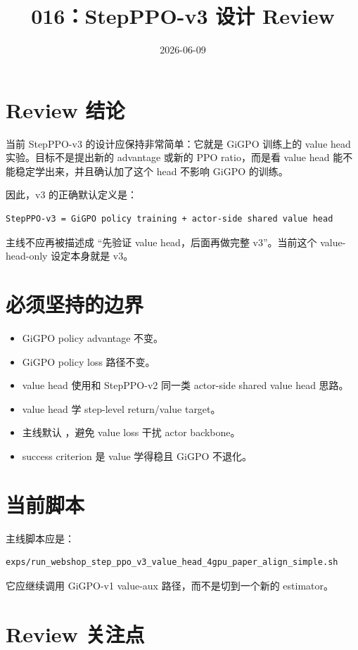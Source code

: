 \documentclass[10pt]{ctexart}
\title{016：StepPPO-v3 设计 Review}
\author{}
\date{2026-06-09}
\begin{document}
\maketitle
\vspace{-1.2em}

\section*{Review 结论}
当前 StepPPO-v3 的设计应保持非常简单：它就是 GiGPO 训练上的 value head 实验。目标不是提出新的 advantage 或新的 PPO ratio，而是看 value head 能不能稳定学出来，并且确认加了这个 head 不影响 GiGPO 的训练。

因此，v3 的正确默认定义是：
\begin{lstlisting}
StepPPO-v3 = GiGPO policy training + actor-side shared value head
\end{lstlisting}

主线不应再被描述成 ``先验证 value head，后面再做完整 v3''。当前这个 value-head-only 设定本身就是 v3。

\section*{必须坚持的边界}
\begin{itemize}
  \item GiGPO policy advantage 不变。
  \item GiGPO policy loss 路径不变。
  \item value head 使用和 StepPPO-v2 同一类 actor-side shared value head 思路。
  \item value head 学 step-level return/value target。
  \item 主线默认 ，避免 value loss 干扰 actor backbone。
  \item success criterion 是 value 学得稳且 GiGPO 不退化。
\end{itemize}

\section*{当前脚本}
主线脚本应是：
\begin{lstlisting}
exps/run_webshop_step_ppo_v3_value_head_4gpu_paper_align_simple.sh
\end{lstlisting}

它应继续调用 GiGPO-v1 value-aux 路径，而不是切到一个新的  estimator。

\section*{Review 关注点}
\end{document}
